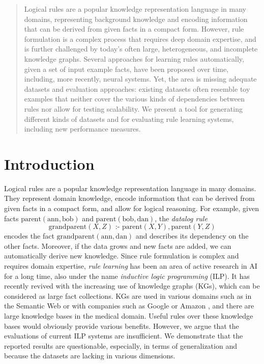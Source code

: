 \documentclass[letterpaper]{article} \usepackage{aaai20}  \usepackage{times}  \usepackage{helvet} \usepackage{courier}  \usepackage[hyphens]{url}  \usepackage{graphicx} \urlstyle{rm} \def\UrlFont{\rm}  \usepackage{graphicx}  \frenchspacing  \setlength{\pdfpagewidth}{8.5in}  \setlength{\pdfpageheight}{11in}  \usepackage{amsthm}
\author{
Cristina Cornelio \\
IBM Research\\
cor@zurich.ibm.com
\And
Veronika Thost\\
IBM Research\\
veronika.thost@ibm.com
}
\theoremstyle{definition}
\newcommand{\ass}{\text{ :- }}
\newcommand{\expred}[1]{\textrm{#1}\xspace}
\newcommand{\exconst}[1]{\textrm{#1}\xspace}
\begin{document}
\maketitle

\begin{abstract}
Logical rules are a popular knowledge representation language in many domains, representing background knowledge and encoding information that can be derived from given facts in a compact form.
However, rule 
formulation is a complex process that requires deep domain expertise,
and is further challenged by today's often 
large, heterogeneous, and incomplete 
knowledge graphs. 
Several approaches for learning rules automatically, given 
a set of input example facts,
have been proposed over time,
including, more recently, neural systems.
Yet, the area is missing adequate datasets and evaluation approaches: existing datasets 
often resemble toy examples that neither cover the various kinds of dependencies between rules nor allow for testing scalability.
We present a tool for generating different kinds of 
datasets and for evaluating rule learning systems, including new performance measures.
\end{abstract}



\section{Introduction}

Logical rules are a popular knowledge representation language in many domains. They represent domain knowledge, encode information that can be derived from given facts in a compact form, and allow for logical reasoning.
For example, given facts $\expred{parent}(\exconst{ann},\exconst{bob})$ and $\expred{parent}(\exconst{bob},\exconst{dan})$, the \emph{datalog rule} \cite{datalog} 
$$\expred{grandparent}(X,Z)\ass\expred{parent}(X,Y),\expred{parent}(Y,Z)$$ encodes the fact $\expred{grandparent}(\exconst{ann},\exconst{dan})$ and describes its dependency on the other facts. Moreover, if the data grows and new facts are added, we can automatically derive new knowledge.
Since rule formulation is complex and requires domain expertise,
\emph{rule learning} \cite{Raedt-08-Logical-and-relational-learning,Fuernkranz+-12-Foundations-of-Rule-Learning} has been an area of active research in AI for a long time, also under the name \emph{inductive logic programming} (ILP). 
It has recently revived with the 
increasing use of knowledge graphs (KGs), which can be considered as large fact collections. 
KGs are used in various domains such as in the Semantic Web or with companies such as Google \cite{google} or Amazon \cite{amazon}, and there are large knowledge bases in the medical domain. Useful rules over these knowledge bases would obviously provide various benefits.
However, we argue that the evaluations of current ILP systems are insufficient. We demonstrate that the reported results are questionable, especially, in terms of generalization and because the datasets are lacking in various dimensions.
\end{document}
